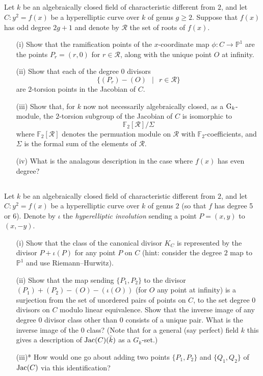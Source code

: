 \documentclass[12pt]{amsart}
\numberwithin{equation}{section}
\theoremstyle{remark}
\theoremstyle{definition}
\theoremstyle{definition}
\theoremstyle{definition}
\theoremstyle{definition}
\theoremstyle{definition}
\theoremstyle{definition}
\begin{document}
\subsection{}
Let $k$ be an algebraically closed field of characteristic different from $2$, and let $C:y^2=f(x)$ be a hyperelliptic curve over $k$ of genus $g\geq 2$. Suppose that $f(x)$ has odd degree $2g+1$ and denote by $\mathcal{R}$ the set of roots of $f(x)$.
\begin{itemize}
\item[(i)] Show that the ramification points of the $x$-coordinate map $\phi:C\rightarrow \mathbb{P}^1$ are the points $P_r=(r,0)$ for $r\in \mathcal{R}$, along with the unique point $O$ at infinity.
\item[(ii)] Show that each of the degree $0$ divisors \[\{(P_r)-(O)~~\mid ~~r\in \mathcal{R}\}\] are $2$-torsion points in the Jacobian of $C$.
\item[(iii)] Show that, for $k$ now not necessarily algebraically closed, as a $\textup{G}_k$-module, the $2$-torsion subgroup of the Jacobian of $C$ is isomorphic to
\[\mathbb{F}_2[\mathcal{R}]/\Sigma\]
where $\mathbb{F}_2[\mathcal{R}]$ denotes the permuation module on $\mathcal{R}$ with $\mathbb{F}_2$-coefficients, and $\Sigma$ is the formal sum of  the elements of $\mathcal{R}$. 
\item[(iv)] What is the analagous description in the case where $f(x)$ has even degree?
\end{itemize}

\subsection{}
Let $k$ be an algebraically closed field of characteristic different from $2$, and let $C:y^2=f(x)$ be a hyperelliptic curve over $k$ of genus $2$ (so that $f$ has degree 5 or 6). Denote by $\iota$ the \textit{hyperelliptic involution} sending a point $P=(x,y)$ to $(x,-y)$. 
\begin{itemize}
\item[(i)] Show that the class of the canonical divisor $K_C$ is represented by the divisor $P+\iota(P)$ for any point $P$ on $C$ (hint: consider the degree $2$ map to $\mathbb{P}^1$ and use Riemann--Hurwitz).
\item[(ii)] Show that the map sending  $\{P_1,P_2\}$  to the divisor $(P_1)+(P_2)-(O)-(\iota(O))$ (for $O$ any point at infinity) is a surjection from the set of unordered pairs of points on $C$, to the set degree $0$ divisors on $C$ modulo linear equivalence. Show that the inverse image of any degree $0$ divisor class other than $0$ consists of a unique pair. What is the inverse image of the $0$ class? (Note that for a general (say perfect) field $k$ this gives a description of $\textup{Jac}(C)(\bar{k})$ as a $G_k$-set.)
\item[(iii)*] How would one go about adding two points $\{P_1,P_2\}$ and $\{Q_1,Q_2\}$ of $\textup{Jac}(C)$ via this identification?
\end{itemize}
\end{document}
